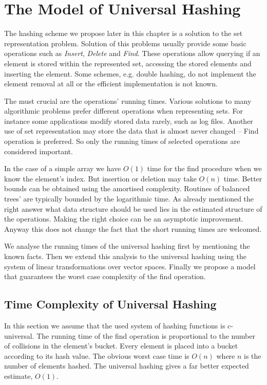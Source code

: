 \chapter{The Model of Universal Hashing}
\label{chapter-proposed-model}

The hashing scheme we propose later in this chapter is a solution to the set representation problem. Solution of this problems usually provide some basic operations such as \emph{Insert}, \emph{Delete} and \emph{Find}. These operations allow querying if an element is stored within the represented set, accessing the stored elements and inserting the element. Some schemes, e.g. double hashing, do not implement the element removal at all or the efficient implementation is not known.

The must crucial are the operations' running times. Various solutions to many algorithmic problems prefer different operations when representing sets. For instance some applications modify stored data rarely, such as log files. Another use of set representation may store the data that is almost never changed -- Find operation is preferred. So only the running times of selected operations are considered important. 

In the case of a simple array we have $O(1)$ time for the find procedure when we know the element's index. But insertion or deletion may take $O(n)$ time. Better bounds can be obtained using the amortised complexity. Routines of balanced trees' are typically bounded by the logarithmic time. As already mentioned the right answer what data structure should be used lies in the estimated structure of the operations. Making the right choice can be an asymptotic improvement. Anyway this does not change the fact that the short running times are welcomed.

We analyse the running times of the universal hashing first by mentioning the known facts. Then we extend this analysis to the universal hashing using the system of linear transformations over vector spaces. Finally we propose a model that guarantees the worst case complexity of the find operation.

\section{Time Complexity of Universal Hashing}
In this section we assume that the used system of hashing functions is $c$-universal. The running time of the find operation is proportional to the number of collisions in the element's bucket. Every element is placed into a bucket according to its hash value. The obvious worst case time is $O(n)$ where $n$ is the number of elements hashed. The universal hashing gives a far better expected estimate, $O(1)$.

